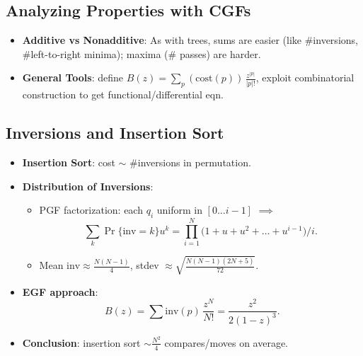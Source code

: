 \documentclass[11pt,letterpaper]{article}
\begin{document}
\subsection{Analyzing Properties with CGFs}
\begin{itemize}
  \item \textbf{Additive vs Nonadditive}: As with trees, sums are easier (like \#inversions, \#left-to-right minima); maxima (\# passes) are harder.
  \item \textbf{General Tools}: define $\displaystyle B(z)= \sum_{p} (\text{cost}(p))\,\frac{z^{|p|}}{|p|!}$, exploit combinatorial construction to get functional/differential eqn.
\end{itemize}

\subsection{Inversions and Insertion Sort}
\begin{itemize}
  \item \textbf{Insertion Sort}: cost $\sim$ \#inversions in permutation.
  \item \textbf{Distribution of Inversions}: 
    \begin{itemize}
      \item PGF factorization: each $q_i$ uniform in $[0\dots i-1]$ $\implies$ 
      \[
        \sum_{k} \Pr\{\mathrm{inv}=k\}u^k 
        = \prod_{i=1}^N \bigl(1+u+u^2+\dots+u^{i-1}\bigr)/i.
      \]
      \item Mean $\mathrm{inv}\approx \frac{N(N-1)}{4}$, stdev $\approx \sqrt{\frac{N(N-1)(2N+5)}{72}}$.
    \end{itemize}
  \item \textbf{EGF approach}:
    \[
      B(z)= \sum \mathrm{inv}(p)\,\frac{z^N}{N!}
      = \frac{z^2}{2(1-z)^3}.
    \]
  \item \textbf{Conclusion}: insertion sort $\sim \frac{N^2}{4}$ compares/moves on average.
\end{itemize}

\end{document}
